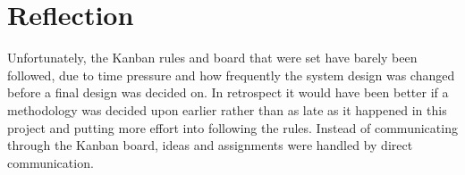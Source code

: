 \section{Reflection}

Unfortunately, the Kanban rules and board that were set have barely been followed, due to time pressure and how frequently the system design was changed before a final design was decided on. In retrospect it would have been better if a methodology was decided upon earlier rather than as late as it happened in this project and putting more effort into following the rules. Instead of communicating through the Kanban board, ideas and assignments were handled by direct communication.
